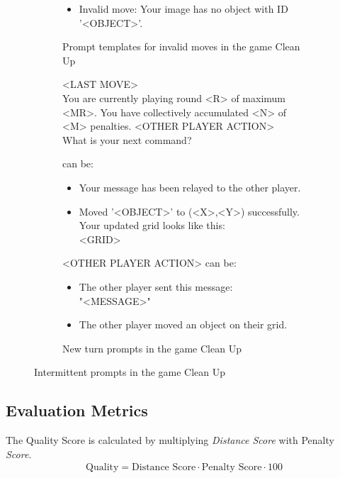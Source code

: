 \documentclass[../main.tex]{subfiles}
\begin{document}
\begin{figure}
\begin{subfigure}[b]{1\textwidth}
\begin{itemize}
          \item Invalid move: Your image has no object with ID '<OBJECT>'.
      \end{itemize}
    \caption{Prompt templates for invalid moves in the game Clean Up}
    \label{fig:clean_up_invalid_move}
  \end{subfigure}
  \begin{subfigure}[b]{1\textwidth}
    \begin{prompt}
        <LAST MOVE> \\
        You are currently playing round <R> of maximum <MR>. You have collectively accumulated <N> of <M> penalties. 
        <OTHER PLAYER ACTION> \\
        What is your next command?
    \end{prompt}
     can be:
    \begin{itemize}
        \item Your message has been relayed to the other player.
        \item Moved '<OBJECT>' to (<X>,<Y>) successfully. Your updated grid looks like this:\\<GRID>
    \end{itemize}
    <OTHER PLAYER ACTION> can be:
    \begin{itemize}
        \item The other player sent this message:\\"<MESSAGE>"
        \item The other player moved an object on their grid.
    \end{itemize}
  \caption{New turn prompts in the game Clean Up}
  \label{fig:clean_up_new_turn}
  \end{subfigure}
\caption{Intermittent prompts in the game Clean Up}
\label{fig:clean_up_intermittent_prompts}
\end{figure}

\subsection{Evaluation Metrics}\label{subsec:appendix_cleanup_evaluation_metric}

The Quality Score is calculated by multiplying \textit{Distance Score} with Penalty \textit{Score}.
\begin{align*}
\text{Quality} = \text{Distance Score} \cdot \text{Penalty Score} \cdot 100
\end{align*}
\end{document}
